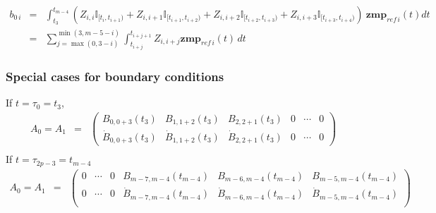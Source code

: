 \documentclass {article}
\newcommand\zmprefi{\mathbf{zmp}_{ref\,i}}
\begin{document}
\begin{eqnarray*}
  b_{0\,i} &=& \int_{t_3}^{t_{m-4}}(Z_{i, i} \mathbb{I}_{[t_i, t_{i+1})} + Z_{i,i+1} \mathbb{I}_{[t_{i+1}, t_{i+2})} +Z_{i,i+2} \mathbb{I}_{[t_{i+2}, t_{i+3})}+Z_{i,i+3} \mathbb{I}_{[t_{i+3}, t_{i+4})})\ \zmprefi(t)dt \\
  &=& \sum_{j=\max(0,3-i)}^{\min(3,m-5-i)} \int_{t_{i+j}}^{t_{i+j+1}} Z_{i,i+j} \zmprefi(t)\,dt
\end{eqnarray*}

\subsubsection* {Special cases for boundary conditions}
If $t = \tau_0 = t_3$,
\begin{eqnarray*}
  A_0 = A_1 &=& \left(\begin{array}{cccccc}B_{0,0+3}(t_3)&B_{1,1+2}(t_3)&B_{2,2+1}(t_3)&0&\cdots&0\\
    \dot{B}_{0,0+3}(t_3)&\dot{B}_{1,1+2}(t_3)&\dot{B}_{2,2+1}(t_3)&0&\cdots&0\end{array}\right) \\
\end{eqnarray*}
If $t = \tau_{2p-3} = t_{m-4}$
\begin{eqnarray*}
  A_0 = A_1 &=& \left(\begin{array}{cccccc}0&\cdots&0&B_{m-7,m-4}(t_{m-4})&B_{m-6,m-4}(t_{m-4})&B_{m-5,m-4}(t_{m-4})\\
    0&\cdots&0&\dot{B}_{m-7,m-4}(t_{m-4})&\dot{B}_{m-6,m-4}(t_{m-4})&\dot{B}_{m-5,m-4}(t_{m-4})\\\end{array}\right) \\
\end{eqnarray*}
\end{document}
